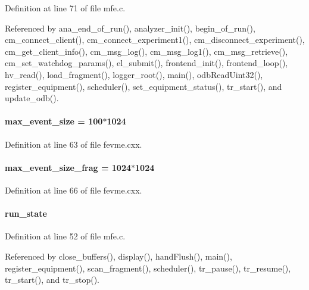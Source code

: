 Definition at line 71 of file mfe.c.

Referenced by ana\_\-end\_\-of\_\-run(), analyzer\_\-init(), begin\_\-of\_\-run(), cm\_\-connect\_\-client(), cm\_\-connect\_\-experiment1(), cm\_\-disconnect\_\-experiment(), cm\_\-get\_\-client\_\-info(), cm\_\-msg\_\-log(), cm\_\-msg\_\-log1(), cm\_\-msg\_\-retrieve(), cm\_\-set\_\-watchdog\_\-params(), el\_\-submit(), frontend\_\-init(), frontend\_\-loop(), hv\_\-read(), load\_\-fragment(), logger\_\-root(), main(), odbReadUint32(), register\_\-equipment(), scheduler(), set\_\-equipment\_\-status(), tr\_\-start(), and update\_\-odb().
\paragraph[{max\_\-event\_\-size}]{ {\bf max\_\-event\_\-size} = 100$\ast$1024}\hfill\label{fevme_8cxx_a13adb6e6b95ca2a62bbfe2453d71a1cd}


Definition at line 63 of file fevme.cxx.
\paragraph[{max\_\-event\_\-size\_\-frag}]{ {\bf max\_\-event\_\-size\_\-frag} = 1024$\ast$1024}\hfill\label{fevme_8cxx_a5593758d19398ebc7c3d58d7f05ec160}


Definition at line 66 of file fevme.cxx.
\paragraph[{run\_\-state}]{ {\bf run\_\-state}}\hfill\label{fevme_8cxx_a81f01ccafac403262a2e430c118516a3}


Definition at line 52 of file mfe.c.

Referenced by close\_\-buffers(), display(), handFlush(), main(), register\_\-equipment(), scan\_\-fragment(), scheduler(), tr\_\-pause(), tr\_\-resume(), tr\_\-start(), and tr\_\-stop().